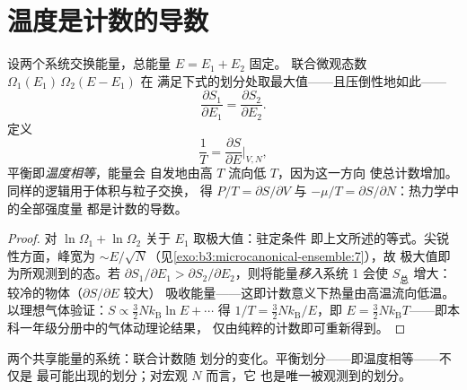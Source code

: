 \section{温度是计数的导数}

\begin{theorem}[平衡与温度]\label{thm:b3:microcanonical-ensemble:temperature}
设两个系统交换能量，总能量 $E = E_1 + E_2$ 固定。
联合微观态数 $\Omega_1(E_1)\,\Omega_2(E - E_1)$ 在
满足下式的划分处取最大值——且压倒性地如此——
\[
\frac{\partial S_1}{\partial E_1} =
\frac{\partial S_2}{\partial E_2} .
\]
定义
\[
\frac1T = \frac{\partial S}{\partial E}\bigg|_{V,N} ,
\]
平衡即\emph{温度相等}，能量会
自发地由高 $T$ 流向低 $T$，因为这一方向
使总计数增加。同样的逻辑用于体积与粒子交换，
得 $P/T = \partial S/\partial V$ 与 $-\mu/T
= \partial S/\partial N$：热力学中的全部强度量
都是计数的导数。
\end{theorem}

\begin{proof}
对 $\ln\Omega_1 + \ln\Omega_2$ 关于 $E_1$ 取极大值：驻定条件
即上文所述的等式。尖锐性方面，峰宽为
$\sim E/\sqrt N$（见\cref{exo:b3:microcanonical-ensemble:7}），故
极大值即为所观测到的态。若 $\partial S_1/\partial E_1 >
\partial S_2/\partial E_2$，则将能量\emph{移入}系统 1 会使
$S_{\text{总}}$ 增大：较冷的物体（$\partial S/\partial E$ 较大）
吸收能量——这即计数意义下热量由高温流向低温。
以理想气体验证：$S \propto \tfrac32 Nk_{\text{B}}\ln E + \cdots$
得 $1/T = \tfrac32 Nk_{\text{B}}/E$，即 $E = \tfrac32
Nk_{\text{B}}T$——即本科一年级分册中的气体动理论结果，
仅由纯粹的计数即可重新得到。
\end{proof}

\begin{omfigure}

{\small 两个共享能量的系统：联合计数随
划分的变化。平衡划分——即温度相等——不仅是
最可能出现的划分；对宏观 $N$ 而言，它
也是唯一被观测到的划分。}
\end{omfigure}

